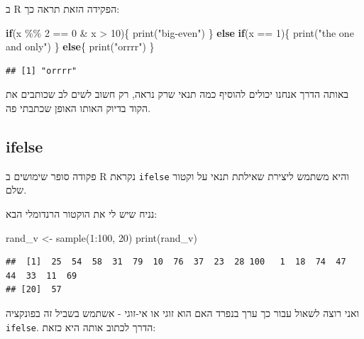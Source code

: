 \documentclass[
]{book}
\newenvironment{Shaded}{\begin{snugshade}}{\end{snugshade}}
\newcommand{\ControlFlowTok}[1]{\textcolor[rgb]{0.13,0.29,0.53}{\textbf{#1}}}
\newcommand{\DecValTok}[1]{\textcolor[rgb]{0.00,0.00,0.81}{#1}}
\newcommand{\FunctionTok}[1]{\textcolor[rgb]{0.00,0.00,0.00}{#1}}
\newcommand{\NormalTok}[1]{#1}
\newcommand{\OtherTok}[1]{\textcolor[rgb]{0.56,0.35,0.01}{#1}}
\newcommand{\SpecialCharTok}[1]{\textcolor[rgb]{0.00,0.00,0.00}{#1}}
\newcommand{\StringTok}[1]{\textcolor[rgb]{0.31,0.60,0.02}{#1}}
\begin{document}
ב
R
הפקידה הזאת תראה כך:

\begin{Shaded}
\begin{Highlighting}[]
\ControlFlowTok{if}\NormalTok{(x }\SpecialCharTok{\%\%} \DecValTok{2} \SpecialCharTok{==} \DecValTok{0} \SpecialCharTok{\&}\NormalTok{ x }\SpecialCharTok{\textgreater{}} \DecValTok{10}\NormalTok{)\{}
  \FunctionTok{print}\NormalTok{(}\StringTok{"big{-}even"}\NormalTok{)}
\NormalTok{\} }\ControlFlowTok{else} \ControlFlowTok{if}\NormalTok{(x }\SpecialCharTok{==} \DecValTok{1}\NormalTok{)\{}
  \FunctionTok{print}\NormalTok{(}\StringTok{"the one and only"}\NormalTok{)}
\NormalTok{\} }\ControlFlowTok{else}\NormalTok{\{}
  \FunctionTok{print}\NormalTok{(}\StringTok{"orrrr"}\NormalTok{)}
\NormalTok{\}}
\end{Highlighting}
\end{Shaded}

\begin{verbatim}
## [1] "orrrr"
\end{verbatim}

באותה הדרך אנחנו יכולים להוסיף כמה תנאי שרק נראה, רק חשוב לשים לב שכותבים את הקוד בדיוק האותו האופן שכתבתי פה.

\hypertarget{ifelse}{%
\subsection{ifelse}\label{ifelse}}

פקודה סופר שימושים ב
R
נקראת
\texttt{ifelse}
והיא משתמש ליצירת שאילתת תנאי על וקטור שלם.

נניח שיש לי את הוקטור הרנדומלי הבא:

\begin{Shaded}
\begin{Highlighting}[]
\NormalTok{rand\_v }\OtherTok{\textless{}{-}} \FunctionTok{sample}\NormalTok{(}\DecValTok{1}\SpecialCharTok{:}\DecValTok{100}\NormalTok{, }\DecValTok{20}\NormalTok{)}
\FunctionTok{print}\NormalTok{(rand\_v)}
\end{Highlighting}
\end{Shaded}

\begin{verbatim}
##  [1]  25  54  58  31  79  10  76  37  23  28 100   1  18  74  47  44  33  11  69
## [20]  57
\end{verbatim}

ואני רוצה לשאול עבור כך ערך בנפרד האם הוא זוגי או אי-זוגי - אשתמש בשביל זה בפונקציה\\
\texttt{ifelse}. הדרך לכתוב אותה היא כזאת:
\end{document}
